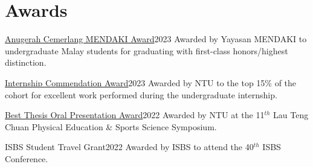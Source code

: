 \documentclass[../main.tex]{subfiles}
\begin{document}
\section{Awards}
  \vspace{2pt}
  \resumeSubHeadingListStart
    \layoutAwards
    {\href{https://drive.google.com/file/d/1e0AXmiUYPABp2iXR39Un3uU56ksY5cPB/view?usp=sharing}{Anugerah Cemerlang MENDAKI Award}}{2023}
    {Awarded by Yayasan MENDAKI to undergraduate Malay students for graduating with first-class honors/highest distinction.}

    \layoutAwards
    {\href{https://drive.google.com/file/d/1-Zf9n5C39MHMhlUNPOGi2Gz_DRpPg0iC/view?usp=sharing}{Internship Commendation Award}}{2023}
    {Awarded by NTU to the top 15\% of the cohort for excellent work performed during the undergraduate internship.}
    
    \layoutAwards
    {\href{https://drive.google.com/file/d/1mcvcseOSgvzBLQg3tZVkGyIOOxVw6gKw/view?usp=sharing}{Best Thesis Oral Presentation Award}}{2022}
    {Awarded by NTU at the 11$^{th}$ Lau Teng Chuan Physical Education \& Sports Science Symposium.}

    \layoutAwards
    {ISBS Student Travel Grant}{2022}
    {Awarded by ISBS to attend the 40$^{th}$ ISBS Conference.}

  \resumeSubHeadingListEnd
\end{document}

